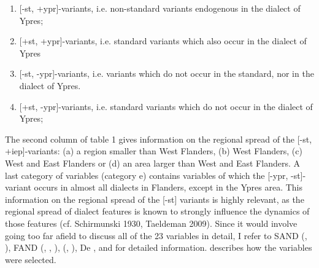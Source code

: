 \documentclass[output=paper]{LSP/langsci}
\begin{document}
\begin{enumerate}
\item {[-st, +ypr]}-variants, i.e. non-standard  variants endogenous in the dialect of Ypres;
\item {[+st, +ypr]}-variants, i.e. standard variants which also occur in the dialect of Ypres
\item {[-st, -ypr]}-variants, i.e. variants which do not occur in the standard, nor in the dialect of Ypres. 
\item {[+st, -ypr]}-variants, i.e. standard variants which do not occur in the dialect of Ypres;
\end{enumerate}
The second column of table 1 gives information on the regional spread of the [-st, +iep]-variants: (a) a region smaller than West Flanders, (b) West Flanders, (c) West and East Flanders or (d) an area larger than West and East Flanders. A last category of variables (category e) contains variables of which the [-ypr, -st]-variant occurs in almost all dialects in Flanders, except in the Ypres area. This information on the regional spread of the [-st] variants is highly relevant, as the regional spread of dialect features is known to strongly influence the dynamics of those features (cf. Schirmunski 1930, Taeldeman 2009). Since it would involve going too far afield to discuss all of the 23 variables in detail, I refer to SAND (\citealt{barbiers_syntactische_2005}, \citealt{barbiers_syntactische_2008}), FAND (\citealt{de_wulf_fonologische_2005}, \citealt{goossens_fonologische_2000}, \citealt{goossens_fonologische_1998}), (\citealt{de_schutter_morfologische_2005}, \citealt{goeman_mand_2008}), De \citet{de_vogelaer_nederlandse_2008}, \citet{cornips_variatie_2009} and \citet{de_vogelaer_iemand_2006} for detailed information. \citet{ghyselen_stabilisering_forthcoming} describes how the variables were selected. 
\end{document}
